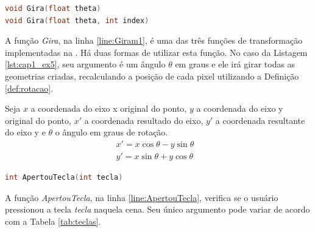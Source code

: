 \begin{lstlisting}[label={func:Gira},language=C++]
void Gira(float theta)
void Gira(float theta, int index)
\end{lstlisting}
A função \emph{Gira}, na linha \ref{line:Giram1}, é uma das três funções de transformação implementadas na \playAPC{}. Há duas formas de utilizar esta função. No caso da Listagem \ref{lst:cap1_ex5}, seu argumento é um ângulo $\theta$ em graus e ele irá girar todas as geometrias criadas, recalculando a posição de cada pixel utilizando a Definição \ref{def:rotacao}. 

\begin{myDef} 
Seja $x$ a coordenada do eixo x original do ponto, $y$ a coordenada do eixo y original do ponto, $x'$ a coordenada resultado do eixo, $y'$ a coordenada resultante do eixo y e $\theta$ o ângulo em graus de rotação.
$$
  \begin{matrix}
  x' = x\cos \theta  - y \sin \theta &\\
  y' = x\sin \theta  + y \cos \theta
  \end{matrix}
$$
\label{def:rotacao}
\end{myDef}

\begin{lstlisting}[label={func:ApertouTecla},language=C++]
int ApertouTecla(int tecla)
\end{lstlisting}
A função \emph{ApertouTecla}, na linha \ref{line:ApertouTecla}, verifica se o usuário pressionou a tecla \emph{tecla} naquela cena. Seu único argumento pode variar de acordo com a Tabela \ref{tab:teclas}.

